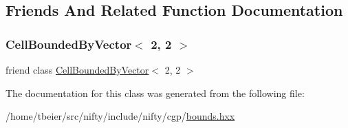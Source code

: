 \subsection{Friends And Related Function Documentation}
\mbox{\label{classnifty_1_1cgp_1_1CellBoundedBy_3_012_00_012_01_4_ac693d488f7701019d117083cebc4508b}} 
\subsubsection{\texorpdfstring{Cell\+Bounded\+By\+Vector$<$ 2, 2 $>$}{CellBoundedByVector< 2, 2 >}}
{\footnotesize\ttfamily friend class \hyperlink{classnifty_1_1cgp_1_1CellBoundedByVector}{Cell\+Bounded\+By\+Vector}$<$ 2, 2 $>$\hspace{0.3cm}{\ttfamily [friend]}}



The documentation for this class was generated from the following file\+:\begin{DoxyCompactItemize}
\item 
/home/tbeier/src/nifty/include/nifty/cgp/\hyperlink{bounds_8hxx}{bounds.\+hxx}\end{DoxyCompactItemize}
